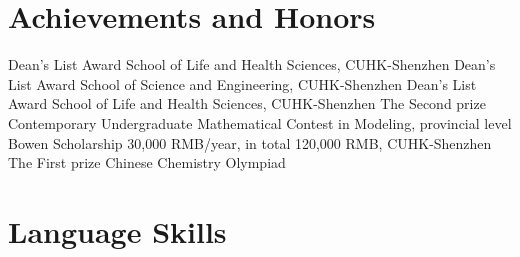 \documentclass[12pt,a4paper,sans]{moderncv}
\newcommand{\cvsection}[1]{\section{{#1}}}
\begin{document}
\cvsection{Achievements and Honors}
{Dean's List Award}{}
{School of Life and Health Sciences, CUHK-Shenzhen}{}
{}
{Dean's List Award}{}
{School of Science and Engineering, CUHK-Shenzhen}{}
{}
{Dean's List Award}{}
{School of Life and Health Sciences, CUHK-Shenzhen}{}
{}
{The Second prize}{}
{Contemporary Undergraduate Mathematical Contest in Modeling, provincial level}{}
{}
{Bowen Scholarship}{}
{30,000 RMB/year, in total 120,000 RMB, CUHK-Shenzhen}{}
{}
{The First prize}{}
{Chinese Chemistry Olympiad}{}
{}




\cvsection{Language Skills}


\end{document}
